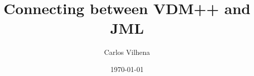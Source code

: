 \documentclass{beamer}
\title{Connecting between VDM++ and JML}
\author{Carlos Vilhena}
\institute{Engineering College of Aarhus}
\date{\today}
\begin{document}
\frame{\titlepage}












\end{document}
